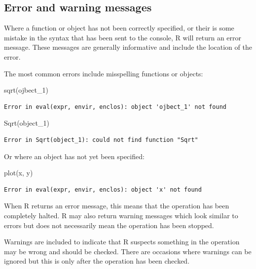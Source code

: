 \documentclass[
  letterpaper,
  DIV=11,
  numbers=noendperiod]{scrreprt}
\newenvironment{Shaded}{\begin{snugshade}}{\end{snugshade}}
\newcommand{\FunctionTok}[1]{\textcolor[rgb]{0.28,0.35,0.67}{#1}}
\newcommand{\NormalTok}[1]{\textcolor[rgb]{0.00,0.23,0.31}{#1}}
\begin{document}
\subsection{Error and warning
messages}\label{error-and-warning-messages}

Where a function or object has not been correctly specified, or their is
some mistake in the syntax that has been sent to the console, R will
return an error message. These messages are generally informative and
include the location of the error.

The most common errors include misspelling functions or objects:

\begin{Shaded}
\begin{Highlighting}[]
\FunctionTok{sqrt}\NormalTok{(ojbect\_1)}
\end{Highlighting}
\end{Shaded}

\begin{verbatim}
Error in eval(expr, envir, enclos): object 'ojbect_1' not found
\end{verbatim}

\begin{Shaded}
\begin{Highlighting}[]
\FunctionTok{Sqrt}\NormalTok{(object\_1)}
\end{Highlighting}
\end{Shaded}

\begin{verbatim}
Error in Sqrt(object_1): could not find function "Sqrt"
\end{verbatim}

Or where an object has not yet been specified:

\begin{Shaded}
\begin{Highlighting}[]
\FunctionTok{plot}\NormalTok{(x, y)}
\end{Highlighting}
\end{Shaded}

\begin{verbatim}
Error in eval(expr, envir, enclos): object 'x' not found
\end{verbatim}

When R returns an error message, this means that the operation has been
completely halted. R may also return warning messages which look similar
to errors but does not necessarily mean the operation has been stopped.

Warnings are included to indicate that R suspects something in the
operation may be wrong and should be checked. There are occasions where
warnings can be ignored but this is only after the operation has been
checked.
\end{document}
